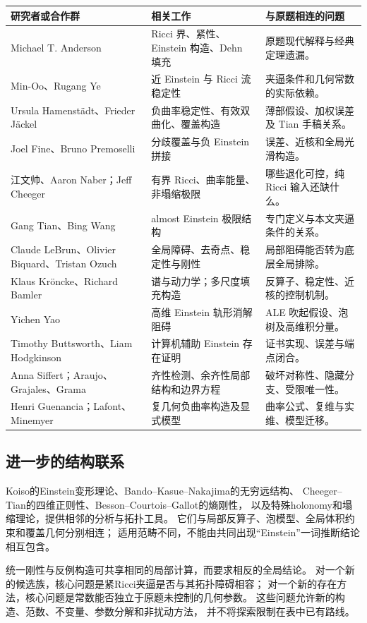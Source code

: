 \documentclass[11pt,a4paper]{article}
\theoremstyle{definition}
\begin{document}
\begin{longtable}{P{0.30\textwidth}P{0.34\textwidth}P{0.27\textwidth}}
\toprule
研究者或合作群 & 相关工作 & 与原题相连的问题\\\midrule\endhead
Michael T. Anderson & Ricci 界、紧性、Einstein 构造、Dehn 填充 & 原题现代解释与经典定理遗漏。\\
Min-Oo、Rugang Ye & 近 Einstein 与 Ricci 流稳定性 & 夹逼条件和几何常数的实际依赖。\\
Ursula Hamenstädt、Frieder Jäckel & 负曲率稳定性、有效双曲化、覆盖构造 & 薄部假设、加权误差及 Tian 手稿关系。\\
Joel Fine、Bruno Premoselli & 分歧覆盖与负 Einstein 拼接 & 误差、近核和全局光滑构造。\\
江文帅、Aaron Naber；Jeff Cheeger & 有界 Ricci、曲率能量、非塌缩极限 & 哪些退化可控，纯 Ricci 输入还缺什么。\\
Gang Tian、Bing Wang & almost Einstein 极限结构 & 专门定义与本文夹逼条件的关系。\\
Claude LeBrun、Olivier Biquard、Tristan Ozuch & 全局障碍、去奇点、稳定性与刚性 & 局部阻碍能否转为底层全局排除。\\
Klaus Kröncke、Richard Bamler & 谱与动力学；多尺度填充构造 & 反算子、稳定性、近核的控制机制。\\
Yichen Yao & 高维 Einstein 轨形消解阻碍 & ALE 吹起假设、泡树及高维积分量。\\
Timothy Buttsworth、Liam Hodgkinson & 计算机辅助 Einstein 存在证明 & 证书实现、误差与端点闭合。\\
Anna Siffert；Araujo、Grajales、Grama & 齐性检测、余齐性局部结构和边界方程 & 破坏对称性、隐藏分支、受限唯一性。\\
Henri Guenancia；Lafont、Minemyer & 复几何负曲率构造及显式模型 & 曲率公式、复维与实维、模型迁移。\\\bottomrule
\end{longtable}

\subsection{进一步的结构联系}
Koiso的Einstein变形理论、Bando--Kasue--Nakajima的无穷远结构、
Cheeger--Tian的四维正则性、Besson--Courtois--Gallot的熵刚性，
以及特殊holonomy和塌缩理论，提供相邻的分析与拓扑工具。
它们与局部反算子、泡模型、全局体积约束和覆盖几何分别相连；
适用范畴不同，不能由共同出现“Einstein”一词推断结论相互包含。

统一刚性与反例构造可共享相同的局部计算，而要求相反的全局结论。
对一个新的候选族，核心问题是紧Ricci夹逼是否与其拓扑障碍相容；
对一个新的存在方法，核心问题是常数能否独立于原题未控制的几何参数。
这些问题允许新的构造、范数、不变量、参数分解和非扰动方法，
并不将探索限制在表中已有路线。
\end{document}
